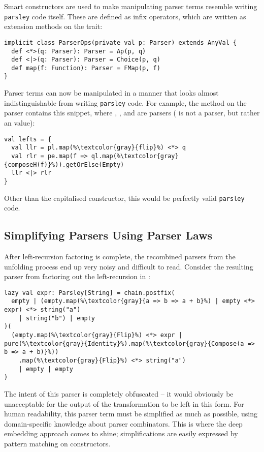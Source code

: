 \documentclass[../../main.tex]{subfiles}
\begin{document}
Smart constructors are used to make manipulating parser terms resemble writing \texttt{parsley} code itself.
These are defined as infix operators, which are written as extension methods on the  trait:
\begin{verbatim}
implicit class ParserOps(private val p: Parser) extends AnyVal {
  def <*>(q: Parser): Parser = Ap(p, q)
  def <|>(q: Parser): Parser = Choice(p, q)
  def map(f: Function): Parser = FMap(p, f)
}
\end{verbatim}
%
Parser terms can now be manipulated in a manner that looks almost indistinguishable from writing \texttt{parsley} code.
For example, the  method on the  parser contains this snippet, where , , and  are parsers ( is not a parser, but rather an  value):
\begin{verbatim}
val lefts = {
  val llr = pl.map(%\textcolor{gray}{flip}%) <*> q
  val rlr = pe.map(f => ql.map(%\textcolor{gray}{composeH(f)}%)).getOrElse(Empty)
  llr <|> rlr
}
\end{verbatim}
Other than the capitalised  constructor, this would be perfectly valid \texttt{parsley} code.

\subsection{Simplifying Parsers Using Parser Laws}\label{sec:simplify-parsers}
After left-recursion factoring is complete, the recombined parsers from the unfolding process end up very noisy and difficult to read.
Consider the resulting parser from factoring out the left-recursion in :
\begin{verbatim}
lazy val expr: Parsley[String] = chain.postfix(
  empty | (empty.map(%\textcolor{gray}{a => b => a + b}%) | empty <*> expr) <*> string("a")
    | string("b") | empty
)(
  (empty.map(%\textcolor{gray}{Flip}%) <*> expr | pure(%\textcolor{gray}{Identity}%).map(%\textcolor{gray}{Compose(a => b => a + b)}%))
    .map(%\textcolor{gray}{Flip}%) <*> string("a")
    | empty | empty
)
\end{verbatim}
%
The intent of this parser is completely obfuscated -- it would obviously be unacceptable for the output of the transformation to be left in this form.
For human readability, this parser term must be simplified as much as possible, using domain-specific knowledge about parser combinators.
This is where the deep embedding approach comes to shine; simplifications are easily expressed by pattern matching on  constructors.
\end{document}
